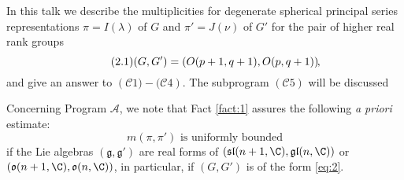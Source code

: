 \documentclass[10pt]{article} %
\newcommand{\tmtextbf}[1]{{\bfseries{#1}}}
\theoremstyle{definition}
\begin{document}

In this talk we describe the multiplicities for degenerate spherical principal series representations $\pi=I(\lambda)$ of $G$ and $\pi'=J(\nu)$ of $G'$ for the pair
of higher real rank groups\begin{equation}\tag{2.1}\label{eq:2}
	(G,G')=\left( O(p+1,q+1),O(p,q+1) \right)\kern-0.1cm,
\end{equation}
and give an answer to $\left( \mathcal{C}1)-(\mathcal{C}4 \right)$. The subprogram $\left( \mathcal{C}5 \right)$ will be discussed

Concerning Program $\mathcal{A}$, we note that Fact \ref{fact:1} assures the following {\it a priori} estimate:\begin{equation*}
	m(\pi,\pi')\mbox{ is uniformly bounded}
\end{equation*}
if the Lie algebras $(\mathfrak{g},\mathfrak{g}')$ are real forms of $(\mathfrak{sl}(n+1,\C),\mathfrak{gl}(n,\C))$
or $(\mathfrak{o}(n+1,\C),\mathfrak{o}(n,\C))$, in particular, if $(G,G')$ is of the form \eqref{eq:2}.
\end{document}
